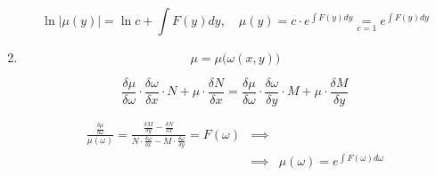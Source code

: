 \documentclass[11pt,a4paper,oneside]{report}
\theoremstyle{definition}
\theoremstyle{plain}
\theoremstyle{remark}
\begin{document}
\begin{enumerate}
          \begin{equation*}
              \ln|\mu(y)| = \ln c + \int F(y)dy, \quad \mu(y) = c\cdot e^{\int F(y)dy} \underset{c = 1}{=} e^{\int F(y)dy}
          \end{equation*}

    \item \begin{equation*}
              \mu = \mu\big(\omega(x,y)\big)
          \end{equation*}

          \begin{equation*}
              \frac{\delta \mu}{\delta \omega} \cdot \frac{\delta \omega}{\delta x} \cdot N + \mu \cdot \frac{\delta N}{\delta x} = \frac{\delta \mu}{\delta \omega} \cdot \frac{\delta \omega}{\delta y} \cdot M + \mu \cdot \frac{\delta M}{\delta y}
          \end{equation*}

          \begin{eqnarray*}
              \frac{\frac{\delta \mu}{\delta \omega}}{\mu(\omega)} = \frac{\frac{\delta M}{\delta y} - \frac{\delta N}{\delta x}}{N\cdot \frac{\delta \omega}{\delta x} - M\cdot \frac{\delta \omega}{\delta y}} = F(\omega) & \implies & \\
              & \implies & \mu(\omega) = e^{\int F(\omega)d\omega}
          \end{eqnarray*}
\end{enumerate}
\end{document}
